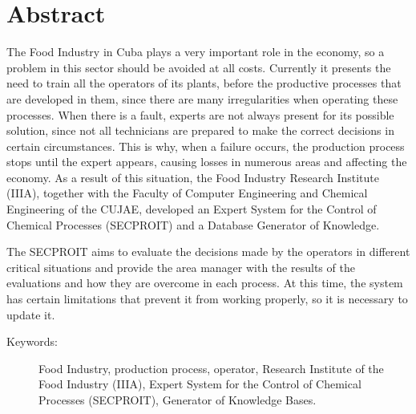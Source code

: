 \section*{Abstract}
The Food Industry in Cuba plays a very important role in the economy, so a problem in this sector should be avoided at all costs. Currently it presents the need to train all the operators of its plants, before the productive processes that are developed in them, since there are many irregularities when operating these processes. When there is a fault, experts are not always present for its possible solution, since not all technicians are prepared to make the correct decisions in certain circumstances. This is why, when a failure occurs, the production process stops until the expert appears, causing losses in numerous areas and affecting the economy.
As a result of this situation, the Food Industry Research Institute (IIIA), together with the Faculty of Computer Engineering and Chemical Engineering of the CUJAE, developed an Expert System for the Control of Chemical Processes (SECPROIT) and a Database Generator of Knowledge.

The SECPROIT aims to evaluate the decisions made by the operators in different critical situations and provide the area manager with the results of the evaluations and how they are overcome in each process. At this time, the system has certain limitations that prevent it from working properly, so it is necessary to update it.

\begin{description}
	\item[Keywords:]{Food Industry, production process, operator, Research Institute of the Food Industry (IIIA), Expert System for the Control of Chemical Processes (SECPROIT), Generator of Knowledge Bases.}
\end{description}